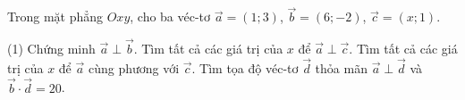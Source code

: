 \begin{bt}%
	Trong mặt phẳng $Oxy$, cho ba véc-tơ $\overrightarrow{a}=(1;3)$, $\overrightarrow{b}=(6;-2)$, $\overrightarrow{c}=(x;1)$.
	\begin{tasks}(1)
		\task Chứng minh $\overrightarrow{a}\perp \overrightarrow{b}$.
		\task Tìm tất cả các giá trị của $x$ để $\overrightarrow{a}\perp \overrightarrow{c}$.
		\task Tìm tất cả các giá trị của $x$ để $\overrightarrow{a}$ cùng phương với $\overrightarrow{c}$.
		\task Tìm tọa độ véc-tơ $\overrightarrow{d}$ thỏa mãn $\overrightarrow{a}\perp \overrightarrow{d}$ và $\overrightarrow{b}\cdot\overrightarrow{d}=20$.
	\end{tasks}
\end{bt}

